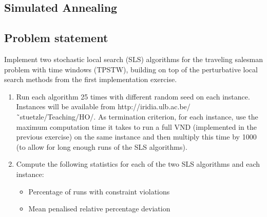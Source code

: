 
\newpage
\begin{homeworkProblem}
\section{Simulated Annealing}
\subsection{Problem statement}
Implement two stochastic local search (SLS) algorithms for the traveling salesman problem with time windows (TPSTW), building on top of the perturbative local search methods from the first implementation exercise.
\begin{enumerate}
  \item Run each algorithm 25 times with different random seed on each instance. Instances will be available from http://iridia.ulb.ac.be/˜stuetzle/Teaching/HO/. As termination criterion, for each instance, use the maximum computation time it takes to run a full VND (implemented in the previous exercise) on the same instance and then multiply this time by 1000 (to allow for long enough runs of the SLS algorithms).
 \item Compute the following statistics for each of the two SLS algorithms and each instance:
 \begin{itemize}
   \item Percentage of runs with constraint violations
   \item Mean penalised relative percentage deviation
 \end{itemize}


\end{enumerate}
\end{homeworkProblem}
